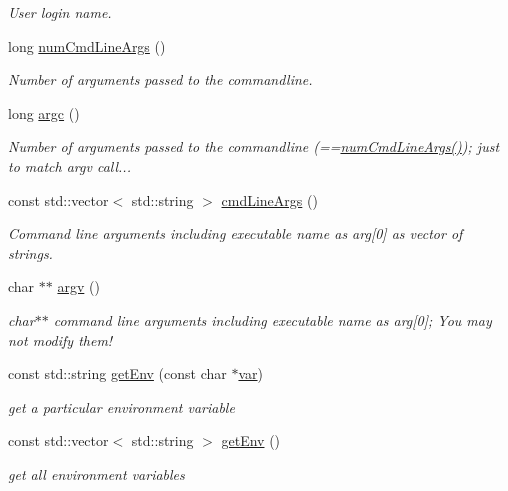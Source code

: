 \begin{DoxyCompactItemize}
\begin{DoxyCompactList}\small\item\em User login name. \end{DoxyCompactList}\item 
long \hyperlink{namespaceSystem_a45f2f8ee27a6b62a7eb104306db16dc9}{num\+Cmd\+Line\+Args} ()
\begin{DoxyCompactList}\small\item\em Number of arguments passed to the commandline. \end{DoxyCompactList}\item 
long \hyperlink{namespaceSystem_aacf2e08c0661f343a44dc174a6931bc6}{argc} ()
\begin{DoxyCompactList}\small\item\em Number of arguments passed to the commandline (==\hyperlink{namespaceSystem_a45f2f8ee27a6b62a7eb104306db16dc9}{num\+Cmd\+Line\+Args()}); just to match argv call... \end{DoxyCompactList}\item 
const std\+::vector$<$ std\+::string $>$ \hyperlink{namespaceSystem_ac5277fb525c07b07bbd94a61e62bc0f5}{cmd\+Line\+Args} ()
\begin{DoxyCompactList}\small\item\em Command line arguments including executable name as arg\mbox{[}0\mbox{]} as vector of strings. \end{DoxyCompactList}\item 
char $\ast$$\ast$ \hyperlink{namespaceSystem_ae3520381fd902d4fce860586feeb6c27}{argv} ()
\begin{DoxyCompactList}\small\item\em char$\ast$$\ast$ command line arguments including executable name as arg\mbox{[}0\mbox{]}; You may not modify them! \end{DoxyCompactList}\item 
const std\+::string \hyperlink{namespaceSystem_af83af19ba6c1083e5643390dfd65f7aa}{get\+Env} (const char $\ast$\hyperlink{classvar}{var})
\begin{DoxyCompactList}\small\item\em get a particular environment variable \end{DoxyCompactList}\item 
const std\+::vector$<$ std\+::string $>$ \hyperlink{namespaceSystem_a072d542bc6ae51093df9c93db06f4e2d}{get\+Env} ()
\begin{DoxyCompactList}\small\item\em get all environment variables \end{DoxyCompactList}\item 
$$
\end{DoxyCompactItemize}
